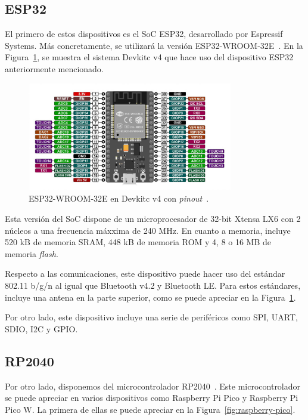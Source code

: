 \subsection{ESP32}\label{subsec:esp32}

El primero de estos dispositivos es el \ac{SoC} ESP32, desarrollado por Espressif Systems.
Más concretamente, se utilizará la versión ESP32-WROOM-32E~\cite{esp32-spec}.
En la Figura~\ref{fig:esp32-pinout}, se muestra el sistema Devkitc v4 que hace uso del dispositivo ESP32 anteriormente mencionado.

\begin{figure}[h]
    \centering
    \includegraphics[width=0.8\textwidth]{figures/esp32-pinout.jpg}
    \caption{ESP32-WROOM-32E en Devkitc v4 con \textit{pinout}~\cite{esp32-pinout}.}
    \label{fig:esp32-pinout}
\end{figure}

Esta versión del \ac{SoC} dispone de un microprocesador de 32-bit Xtensa LX6 con 2 núcleos a una frecuencia máxxima de 240 MHz.
En cuanto a memoria, incluye 520 kB de memoria SRAM, 448 kB de memoria ROM y 4, 8 o 16 MB de memoria \textit{flash}.

Respecto a las comunicaciones, este dispositivo puede hacer uso del estándar 802.11 b/g/n al igual que Bluetooth v4.2 y Bluetooth LE.
Para estos estándares, incluye una antena en la parte superior, como se puede apreciar en la Figura~\ref{fig:esp32-pinout}.

Por otro lado, este dispositivo incluye una serie de periféricos como \ac{SPI}, \ac{UART}, \ac{SDIO}, \ac{I2C} y \ac{GPIO}.



\subsection{RP2040}\label{subsec:RP2040}

Por otro lado, disponemos del microcontrolador RP2040~\cite{rp2040-spec}.
Este microcontrolador se puede apreciar en varios dispositivos como Raspberry Pi Pico y Raspberry Pi Pico W.
La primera de ellas se puede apreciar en la Figura~\ref{fig:raspberry-pico}.

